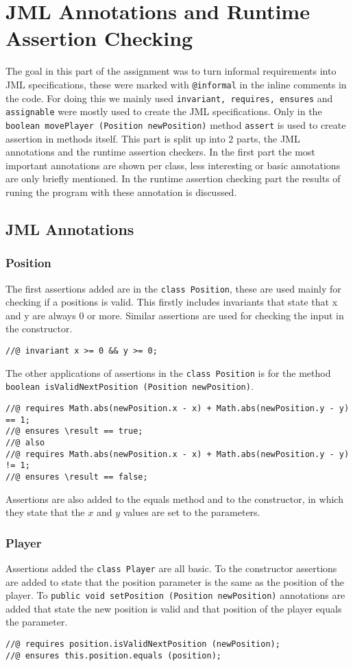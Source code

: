 \documentclass[a4paper]{article}
\begin{document}
	\section{JML Annotations and Runtime Assertion Checking}
	The goal in this part of the assignment was to turn informal requirements into JML specifications, these were marked with \texttt{@informal} in the inline comments in the code. For doing this we mainly used \texttt{invariant, requires, ensures} and \texttt{assignable} were mostly used to create the JML specifications. Only in the \texttt{boolean movePlayer (Position newPosition)} method \texttt{assert} is used to create assertion in methods itself. This part is split up into 2 parts, the JML annotations and the runtime assertion checkers. In the first part the most important annotations are shown per class, less interesting or basic annotations are only briefly mentioned. In the runtime assertion checking part the results of runing the program with these annotation is discussed.

	\subsection{JML Annotations}
	\subsubsection{Position}
	The first assertions added are in the \texttt{class Position}, these are used mainly for checking if a positions is valid. This firstly includes invariants that state that x and y are always 0 or more. Similar assertions are used for checking the input in the constructor.
	\begin{lstlisting}
//@ invariant x >= 0 && y >= 0;
	\end{lstlisting}
	The other applications of assertions in the \texttt{class Position} is for the method \texttt{boolean isValidNextPosition (Position newPosition)}. 
	\begin{lstlisting}
//@ requires Math.abs(newPosition.x - x) + Math.abs(newPosition.y - y) == 1;
//@ ensures \result == true;
//@ also
//@ requires Math.abs(newPosition.x - x) + Math.abs(newPosition.y - y) != 1;
//@ ensures \result == false;
	\end{lstlisting}
	Assertions are also added to the equals method and to the constructor, in which they state that the $x$ and $y$ values are set to the parameters.
	
	\subsubsection{Player}
	Assertions added the \texttt{class Player} are all basic. To the constructor assertions are added to state that the position parameter is the same as the position of the player. To \texttt{public void setPosition (Position newPosition)} annotations are added that state the new position is valid and that position of the player equals the parameter.
	\begin{lstlisting}
//@ requires position.isValidNextPosition (newPosition);
//@ ensures this.position.equals (position);
	\end{lstlisting} 
	
\end{document}
